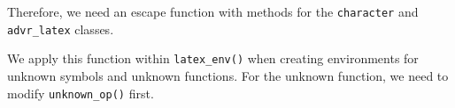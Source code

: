 \documentclass[
]{krantz}
\makeatletter
\newenvironment{Shaded}{\begin{snugshade}}{\end{snugshade}}
\newcommand{\CharTok}[1]{\textcolor[rgb]{0.31,0.60,0.02}{#1}}
\newcommand{\ControlFlowTok}[1]{\textcolor[rgb]{0.13,0.29,0.53}{\textbf{#1}}}
\newcommand{\KeywordTok}[1]{\textcolor[rgb]{0.13,0.29,0.53}{\textbf{#1}}}
\newcommand{\NormalTok}[1]{#1}
\newcommand{\StringTok}[1]{\textcolor[rgb]{0.31,0.60,0.02}{#1}}
\newenvironment{kframe}{%
\medskip{}
\setlength{\fboxsep}{.8em}
 \def\at@end@of@kframe{}%
 \ifinner\ifhmode%
  \def\at@end@of@kframe{\end{minipage}}%
  \begin{minipage}{\columnwidth}%
 \fi\fi%
 \def\FrameCommand##1{\hskip\@totalleftmargin \hskip-\fboxsep
 \colorbox{shadecolor}{##1}\hskip-\fboxsep
     \hskip-\linewidth \hskip-\@totalleftmargin \hskip\columnwidth}%
 \MakeFramed {\advance\hsize-\width
   \@totalleftmargin\z@ \linewidth\hsize
   \@setminipage}}%
 {\par\unskip\endMakeFramed%
 \at@end@of@kframe}
\renewenvironment{Shaded}{\begin{kframe}}{\end{kframe}}
\renewcommand{\KeywordTok} [1]{\textcolor[rgb]{0.00,0.44,0.13}{{#1}}}
\renewcommand{\CharTok}    [1]{\textcolor[rgb]{0.25,0.44,0.63}{{#1}}}
\renewcommand{\StringTok}  [1]{\textcolor[rgb]{0.25,0.44,0.63}{{#1}}}
\renewcommand{\NormalTok}  [1]{{#1}}
\makeatother
\begin{document}
Therefore, we need an escape function with methods for the \texttt{character} and \texttt{advr\_latex} classes.

\begin{Shaded}
\end{Shaded}

We apply this function within \texttt{latex\_env()} when creating environments for unknown symbols and unknown functions. For the unknown function, we need to modify \texttt{unknown\_op()} first.
\end{document}
